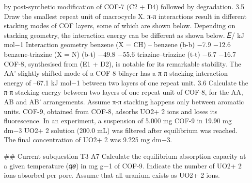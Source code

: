 by post-synthetic modification of COF-7 (C2 + D4) followed by degradation. 3.5 Draw the smallest repeat unit of macrocycle X. π-π interactions result in different stacking modes of COF layers, some of which are shown below. Depending on stacking geometry, the interaction energy can be different as shown below. 𝐸/ kJ mol−1 Interaction geometry benzene (X = CH) – benzene (b-b) −7.9 −12.6 benzene-triazine (X = N) (b-t) −49.8 −55.6 triazine–triazine (t-t) −6.7 −16.7 COF-8, synthesised from (E1 + D2), is notable for its remarkable stability. The AA' slightly shifted mode of a COF-8 bilayer has a π-π stacking interaction energy of –67.1 kJ mol−1 between two layers of one repeat unit. 3.6 Calculate the π-π stacking energy between two layers of one repeat unit of COF-8, for the AA, AB and AB' arrangements. Assume π-π stacking happens only between aromatic units. COF-9, obtained from COF-8, adsorbs UO2+ 2 ions and loses its fluorescence. In an experiment, a suspension of 5.000 mg COF-9 in 19.90 mg dm−3 UO2+ 2 solution (200.0 mL) was filtered after equilibrium was reached. The final concentration of UO2+ 2 was 9.225 mg dm−3.

\#\# Current subquestion T3-A7
Calculate the equilibrium absorption capacity at a given temperature (𝑞𝑒) in mg g−1 of COF-9. Indicate the number of UO2+ 2 ions absorbed per pore. Assume that all uranium exists as UO2+ 2 ions.

